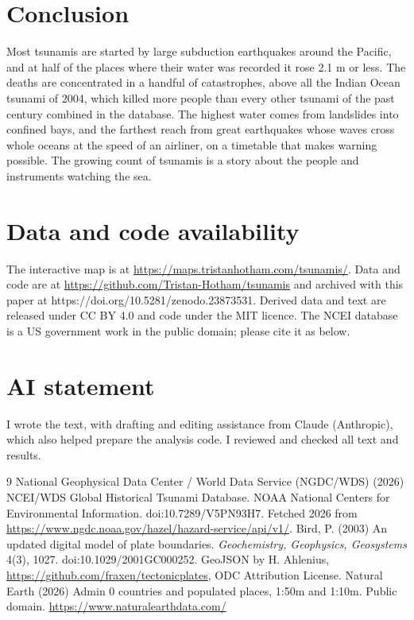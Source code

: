 \documentclass[11pt,a4paper]{article}
\begin{document}
\section{Conclusion}
Most tsunamis are started by large subduction earthquakes around the Pacific, and at half of the places where their water was recorded it rose 2.1 m or less. The deaths are concentrated in a handful of catastrophes, above all the Indian Ocean tsunami of 2004, which killed more people than every other tsunami of the past century combined in the database. The highest water comes from landslides into confined bays, and the farthest reach from great earthquakes whose waves cross whole oceans at the speed of an airliner, on a timetable that makes warning possible. The growing count of tsunamis is a story about the people and instruments watching the sea.

\section*{Data and code availability}
The interactive map is at \url{https://maps.tristanhotham.com/tsunamis/}. Data and code are at \url{https://github.com/Tristan-Hotham/tsunamis} and archived with this paper at https://doi.org/10.5281/zenodo.23873531. Derived data and text are released under CC BY 4.0 and code under the MIT licence. The NCEI database is a US government work in the public domain; please cite it as below.

\section*{AI statement}
I wrote the text, with drafting and editing assistance from Claude (Anthropic), which also helped prepare the analysis code. I reviewed and checked all text and results.

\begin{thebibliography}{9}
 National Geophysical Data Center / World Data Service (NGDC/WDS) (2026) NCEI/WDS Global Historical Tsunami Database. NOAA National Centers for Environmental Information. doi:10.7289/V5PN93H7. Fetched 2026 from \url{https://www.ngdc.noaa.gov/hazel/hazard-service/api/v1/}.
 Bird, P. (2003) An updated digital model of plate boundaries. \textit{Geochemistry, Geophysics, Geosystems} 4(3), 1027. doi:10.1029/2001GC000252. GeoJSON by H. Ahlenius, \url{https://github.com/fraxen/tectonicplates}, ODC Attribution License.
 Natural Earth (2026) Admin 0 countries and populated places, 1:50m and 1:10m. Public domain. \url{https://www.naturalearthdata.com/}
\end{thebibliography}
\end{document}
